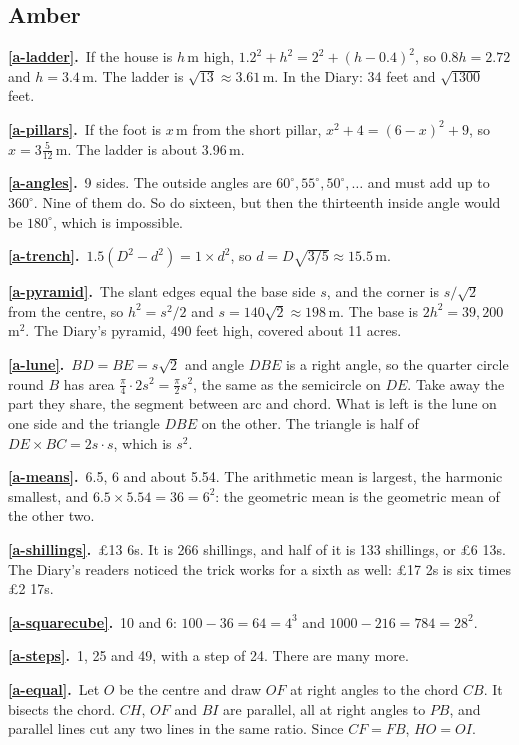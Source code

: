 \documentclass[11pt,a4paper]{article}
\newcommand{\ans}[2]{\par\smallskip\noindent\textbf{\ref{#1}.}\ #2}
\begin{document}
\subsection*{\color{bandamber}Amber}
\ans{a-ladder}{If the house is $h$\,m high, $1.2^2 + h^2 = 2^2 + (h-0.4)^2$, so $0.8h =
2.72$ and $h = 3.4$\,m. The ladder is $\sqrt{13}\approx3.61$\,m. In the Diary: 34 feet
and $\sqrt{1300}$ feet.}
\ans{a-pillars}{If the foot is $x$\,m from the short pillar, $x^2 + 4 = (6-x)^2 + 9$, so
$x = 3\tfrac5{12}$\,m. The ladder is about 3.96\,m.}
\ans{a-angles}{9 sides. The outside angles are $60^\circ, 55^\circ, 50^\circ,\dots$ and
must add up to $360^\circ$. Nine of them do. So do sixteen, but then the thirteenth inside
angle would be $180^\circ$, which is impossible.}
\ans{a-trench}{$1.5(D^2 - d^2) = 1 \times d^2$, so $d = D\sqrt{3/5} \approx 15.5$\,m.}
\ans{a-pyramid}{The slant edges equal the base side $s$, and the corner is $s/\sqrt2$
from the centre, so $h^2 = s^2/2$ and $s = 140\sqrt2 \approx 198$\,m. The base is
$2h^2 = 39{,}200$\,m$^2$. The Diary's pyramid, 490 feet high, covered about 11 acres.}
\ans{a-lune}{$BD = BE = s\sqrt2$ and angle $DBE$ is a right angle, so the quarter circle
round $B$ has area $\tfrac\pi4\cdot 2s^2 = \tfrac\pi2 s^2$, the same as the semicircle on
$DE$. Take away the part they share, the segment between arc and chord. What is left is
the lune on one side and the triangle $DBE$ on the other. The triangle is half of
$DE \times BC = 2s\cdot s$, which is $s^2$.}
\ans{a-means}{6.5, 6 and about 5.54. The arithmetic mean is largest, the harmonic
smallest, and $6.5 \times 5.54 = 36 = 6^2$: the geometric mean is the geometric mean of the
other two.}
\ans{a-shillings}{\pounds13 6s. It is 266 shillings, and half of it is 133 shillings, or
\pounds6 13s. The Diary's readers noticed the trick works for a sixth as well:
\pounds17 2s is six times \pounds2 17s.}
\ans{a-squarecube}{10 and 6: $100 - 36 = 64 = 4^3$ and $1000 - 216 = 784 = 28^2$.}
\ans{a-steps}{1, 25 and 49, with a step of 24. There are many more.}
\ans{a-equal}{Let $O$ be the centre and draw $OF$ at right angles to the chord $CB$. It
bisects the chord. $CH$, $OF$ and $BI$ are parallel, all at right angles to $PB$, and
parallel lines cut any two lines in the same ratio. Since $CF = FB$, $HO = OI$.}
\end{document}
